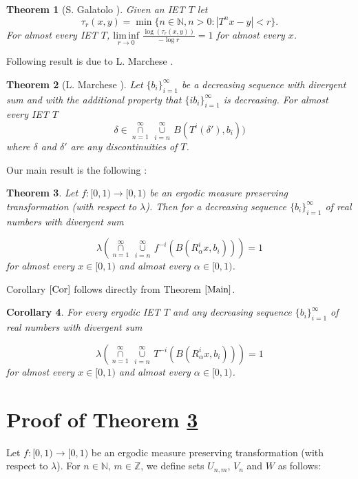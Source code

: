 \documentclass[11pt, english, reqno]{amsart}
\newtheorem{theorem}{Theorem}[section]
\newtheorem{corollary}[theorem]{Corollary}
\theoremstyle{definition}
\theoremstyle{remark}
\numberwithin{equation}{section}
\numberwithin{equation}{section}
\newcommand{\Leb}{\ensuremath{\lambda}}
\newcommand{\LS}{\ensuremath{\underset{n=1}{\overset{\infty}{\cap}} \, {\underset{i=n}{\overset{\infty}{\cup}}}\,}}
\begin{document}
\begin{theorem}[S. Galatolo \cite{Galatolo_2006} ] \label{Galatolo} Given an IET $T$ let $${\tau_r(x,y)=\min \{n\in \mathbb{N}, n>0: |T^nx-y|<r\}}.$$ For almost every IET $T$, ${\underset{ r \to 0}{\mathrm{lim\,inf}}\,\, \frac{ \log(\tau_r(x,y))}{-\log r}= 1}$ for almost every $x$.

\end{theorem}

Following result is due to L. Marchese \cite{Marchese_2011}.

\begin{theorem}[L. Marchese \cite{Marchese_2011}] \label{Marchese} Let $\{b_i\}_{i=1}^{\infty}$ be a decreasing sequence with divergent sum and with the additional property that $\{ib_i\}_{i=1}^{\infty}$ is decreasing. For almost every IET $T$ $$\delta \in \LS B(T^i(\delta'),b_i))$$ where $\delta$ and $\delta'$ are any discontinuities of $T$.
\end{theorem} Our main result is the following :

\begin{theorem}\label{Main} Let $f: [0,1) \rightarrow [0,1)$ be an ergodic measure preserving transformation (with respect to $\lambda$). Then for a decreasing sequence $\{b_i\}_{i=1}^{\infty}$ of real numbers with divergent sum

$$
\Leb(\LS f^{-i}(B (R_{\alpha}^{i} x,b_i)))=1
$$ for almost every $x \in [0,1)$ and almost every $\alpha \in [0,1)$.

\end{theorem} Corollary $\ref{Cor}$ follows directly from Theorem $\ref{Main}$.

\begin{corollary} \label{Cor} For every ergodic IET $T$ and any decreasing sequence $\{b_i\}_{i=1}^{\infty}$ of real numbers with divergent sum

$$
\lambda(\LS T^{-i}(B(R^i_{\alpha}x,b_i))) = 1
$$ for almost every $x \in [0,1)$ and almost every $\alpha \in [0,1)$.

\end{corollary}

\section{Proof of Theorem \ref{Main}}\label{proof}

Let $f: [0,1) \rightarrow [0,1)$ be an ergodic measure preserving transformation (with respect to $\lambda$). For $n\in \mathbb{N},\, m \in \mathbb{Z}$, we define sets $U_{n,m}$, $V_n$ and $W$ as follows:
\end{document}
